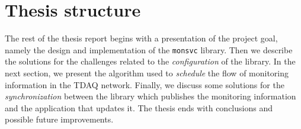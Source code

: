\section{Thesis structure}

The rest of the thesis report begins with a presentation of the project goal, namely the design and implementation of the {\tt monsvc} library. Then we describe the solutions for the challenges related to the \emph{configuration} of the library. In the next section, we present the algorithm used to \emph{schedule} the flow of monitoring information in the TDAQ network. Finally, we discuss some solutions for the \emph{synchronization} between the library which publishes the monitoring information and the application that updates it. The thesis ends with conclusions and possible future improvements.

